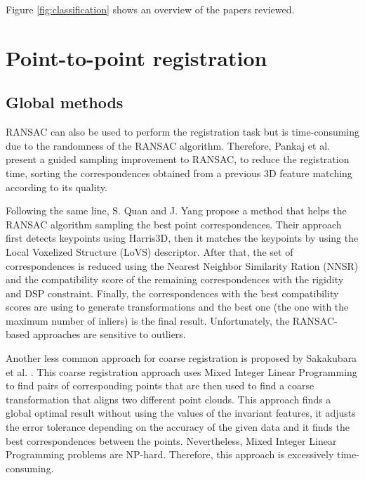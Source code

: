     Figure \ref{fig:classification} shows an overview of the papers reviewed.



    \section{Point-to-point registration}

        \subsection{Global methods}

        RANSAC \cite{Fischler_1981_RANSAC} can also be used to perform the registration task but is time-consuming due to the randomness
        of the RANSAC algorithm. Therefore, Pankaj et al. \cite{Pankaj_2015_arobust} present a guided sampling improvement to RANSAC,
        to reduce the registration time, sorting the correspondences obtained from a previous 3D feature matching according to its quality.
        
        Following the same line, S. Quan and J. Yang \cite{Quan_2020_com} propose a method that helps the RANSAC algorithm 
        sampling the best point correspondences. Their approach first detects keypoints using Harris3D, then it matches the keypoints
        by using the Local Voxelized Structure (LoVS) descriptor. After that, the set of correspondences is reduced using the 
        Nearest Neighbor Similarity Ration (NNSR) and the compatibility score of the remaining correspondences with the rigidity and 
        DSP constraint. Finally, the correspondences with the best compatibility scores are using to generate transformations and 
        the best one (the one with the maximum number of inliers) is the final result. Unfortunately, the RANSAC-based approaches are sensitive to outliers.

        Another less common approach for coarse registration is proposed by Sakakubara et al. \cite{Sakakubara_2007_automatic}.
        This coarse registration approach uses Mixed Integer Linear Programming to find pairs of corresponding points that are then 
        used to find a coarse transformation that aligns two different point clouds.
        This approach finds a global optimal result without using the values of the invariant features, 
        it adjusts the error tolerance depending on the accuracy of the given data and 
        it finds the best correspondences between the points.
        Nevertheless, Mixed Integer Linear Programming problems are NP-hard. Therefore, this approach is excessively time-consuming.

